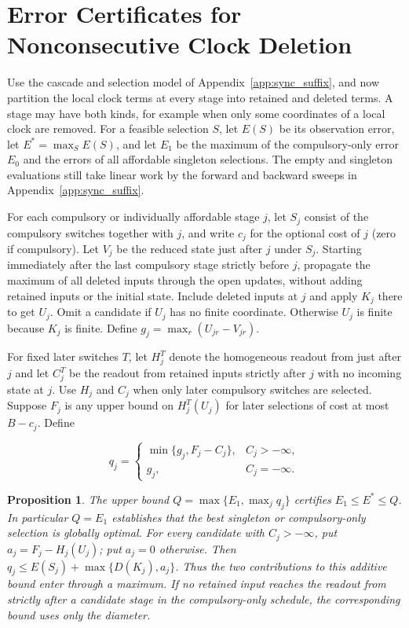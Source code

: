 \documentclass[11pt,letterpaper]{article}
\newtheorem{appprop}{Proposition}[section]
\begin{document}
\section{Error Certificates for Nonconsecutive Clock Deletion}
\label{app:nonconsecutive_deletion}

Use the cascade and selection model of Appendix~\ref{app:sync_suffix}, and now partition the local clock terms at every stage into retained and deleted terms. A stage may have both kinds, for example when only some coordinates of a local clock are removed. For a feasible selection $S$, let $E(S)$ be its observation error, let $E^*=\max_S E(S)$, and let $E_1$ be the maximum of the compulsory-only error $E_0$ and the errors of all affordable singleton selections. The empty and singleton evaluations still take linear work by the forward and backward sweeps in Appendix~\ref{app:sync_suffix}.

For each compulsory or individually affordable stage $j$, let $S_j$ consist of the compulsory switches together with $j$, and write $c_j$ for the optional cost of $j$ (zero if compulsory). Let $V_j$ be the reduced state just after $j$ under $S_j$. Starting immediately after the last compulsory stage strictly before $j$, propagate the maximum of all deleted inputs through the open updates, without adding retained inputs or the initial state. Include deleted inputs at $j$ and apply $K_j$ there to get $U_j$. Omit a candidate if $U_j$ has no finite coordinate. Otherwise $U_j$ is finite because $K_j$ is finite. Define $g_j=\max_r(U_{jr}-V_{jr})$.

For fixed later switches $T$, let $H_j^T$ denote the homogeneous readout from just after $j$ and let $C_j^T$ be the readout from retained inputs strictly after $j$ with no incoming state at $j$. Use $H_j$ and $C_j$ when only later compulsory switches are selected. Suppose $F_j$ is any upper bound on $H_j^T(U_j)$ for later selections of cost at most $B-c_j$. Define

\[
q_j=\begin{cases}
\min\{g_j,F_j-C_j\}, & C_j> -\infty,\\
g_j, & C_j=-\infty.
\end{cases}
\]

\begin{appprop}
\label{prop:clock_deletion_certificate}
The upper bound $Q=\max\{E_1,\max_j q_j\}$ certifies $E_1\le E^*\le Q$. In particular $Q=E_1$ establishes that the best singleton or compulsory-only selection is globally optimal. For every candidate with $C_j> -\infty$, put $a_j=F_j-H_j(U_j)$; put $a_j=0$ otherwise. Then $q_j\le E(S_j)+\max\{D(K_j),a_j\}$. Thus the two contributions to this additive bound enter through a maximum. If no retained input reaches the readout from strictly after a candidate stage in the compulsory-only schedule, the corresponding bound uses only the diameter.
\end{appprop}
\end{document}
